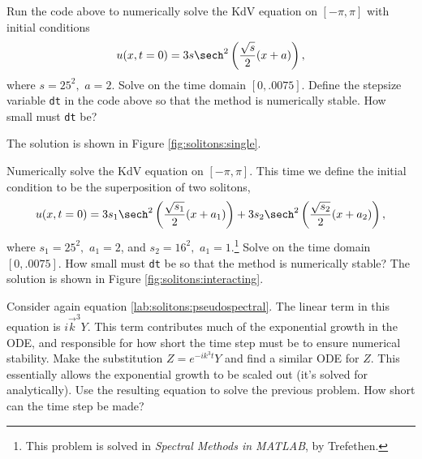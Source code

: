 
Run the code above to numerically solve the KdV equation on $[-\pi,\pi]$ with initial conditions 
\[
u(x,t=0) = 3s\sech^2\left(\frac{\sqrt{s}}{2}(x+a)\right),
\]
where $s = 25^2,$ $a = 2$. Solve on the time domain $[0,.0075]$. Define the stepsize variable {\tt dt} in the code above so that the method is numerically stable.  How small must {\tt dt} be? 

The solution is shown in Figure \ref{fig:solitons:single}.
\label{problem:solitons:single}

Numerically solve the KdV equation on $[-\pi,\pi]$. This time we define the initial condition 
to be the superposition of two solitons,
\[
u(x,t=0) = 3s_1\sech^2\left(\frac{\sqrt{s_1}}{2}(x+a_1)\right) + 3s_2\sech^2\left(\frac{\sqrt{s_2}}{2}(x+a_2)\right),
\]
where $s_1 = 25^2,$ $a_1 = 2$, and $s_2 = 16^2,$ $a_1 = 1$.\footnote{This problem is solved in \textit{Spectral Methods in MATLAB}, by Trefethen.} Solve on the time domain $[0,.0075]$.  How small must {\tt dt} be so that the method is numerically stable?  The solution is shown in Figure \ref{fig:solitons:interacting}.
\label{problem:solitons:interacting}

	Consider again equation \eqref{lab:solitons:pseudospectral}. The linear term in this equation is 
	$i\vec{k}^3Y$. This term contributes much of the exponential growth in the ODE, and responsible for 
	how short the time step must be to ensure numerical stability. Make the substitution $Z = e^{-ik^3t}Y$ and find a similar ODE for $Z$. This essentially allows the exponential growth to be scaled out (it's solved for analytically). Use the resulting equation to solve the previous problem. How short can the time step be made? 

% 
% 
% 
